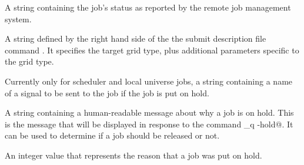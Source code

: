 \begin{description}
\item[\AdAttr{GridJobStatus}:] A string containing the job's status as
reported by the remote job management system.

\item[\AdAttr{GridResource}:] A string defined by the right hand side
of the the submit description file command .
It specifies the target grid type, plus additional parameters
specific to the grid type.

\item[\AdAttr{HoldKillSig}:]    Currently only for scheduler and local
universe jobs,
a string containing a name of
a signal to be sent to the job if the job is put on hold.

\item[\AdAttr{HoldReason}:]    A string containing a human-readable
message about why a job is on hold.
This is the message that will be displayed in response to
the command \verb@condor_q -hold@.
It can be used to determine if a job should be released or not.

\item[\AdAttr{HoldReasonCode}:]    An integer value that represents the
reason that a job was put on hold.


\end{description}
